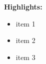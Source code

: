 \documentclass[como,a4paper,12pt,final]{Classes/c4e-preprint}
\begin{document}
\textbf{Highlights:}
\begin{itemize}
\item item 1
\item item 2
\item item 3
\end{itemize}

\vfill

\clearpage \setcounter{tocdepth}{3} \tableofcontents

\clearpage


\clearpage \appendix
{}


\clearpage \citeindexfalse

\end{document}
